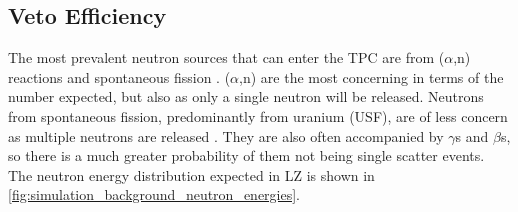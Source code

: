 \subsection{Veto Efficiency}
\label{sec:od_simulation_efficiency}
\par
The most prevalent neutron sources that can enter the TPC are from ($\alpha$,n) reactions and spontaneous fission \cite{LZ_projected_sensitivity_paper_ref}.
($\alpha$,n) are the most concerning in terms of the number expected, but also as only a single neutron will be released.
Neutrons from spontaneous fission, predominantly from uranium (USF), are of less concern as multiple neutrons are released \cite{usf_ref}.
They are also often accompanied by $\gamma$s and $\beta$s, so there is a much greater probability of them not being single scatter events.
The neutron energy distribution expected in LZ is shown in \autoref{fig:simulation_background_neutron_energies}.



